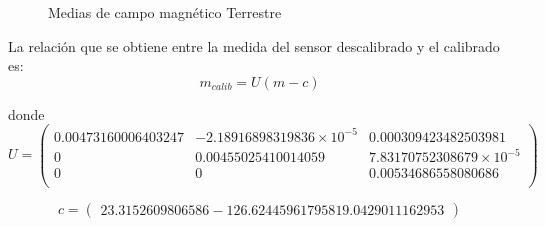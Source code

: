 \documentclass[spanish,12pt,a4paper,titlepage]{report}
\begin{document}
\begin{figure}
  \begin{center}
	
  \end{center}
  \caption{Medias de campo magnético Terrestre}
\end{figure}

La relación que se obtiene entre la medida del sensor descalibrado y el calibrado es:
\begin{equation}
m_{calib}=U(m-c)
\end{equation}

donde 
$$
U=\left( \begin{array}{ccc}
 0.00473160006403247   &  -2.18916898319836\times10^{-5}    &  0.000309423482503981 \\
                         0      & 0.00455025410014059   &   7.83170752308679\times10^{-5} \\
                         0     &                    0   &    0.00534686558080686 \\
\end{array}
\right)
$$

$$
c=\left(\begin{array}{c}
23.3152609806586
         -126.624459617958
          19.0429011162953
\end{array}\right)
$$
\end{document}
